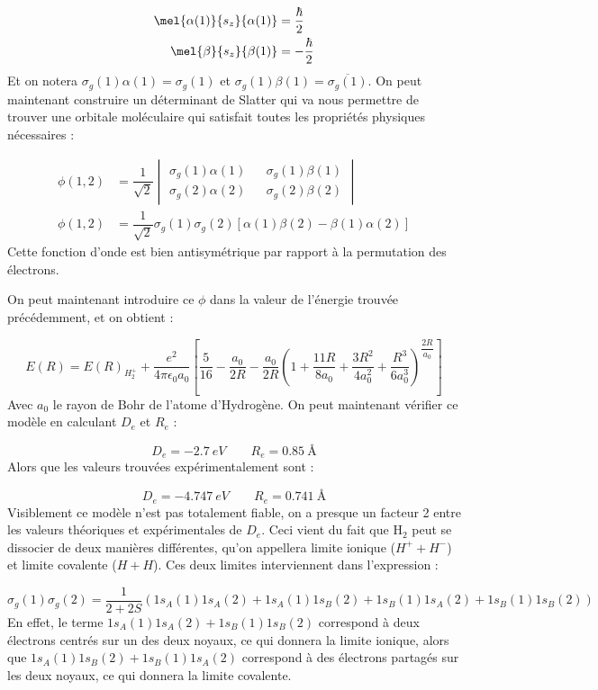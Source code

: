 \begin{align*}
    \mel{\alpha(1)}{s_z}{\alpha(1)} &= \dfrac{\hbar}{2}\\
    \mel{\beta}{s_z}{\beta(1)} &= -\dfrac{\hbar}{2}
\end{align*}
Et on notera $\sigma_g(1)\alpha(1) = \sigma_g(1)$ et $\sigma_g(1)\beta(1) = \overline{\sigma_g(1)}$. On peut maintenant construire un déterminant de Slatter qui va nous permettre de trouver une orbitale moléculaire qui satisfait toutes les propriétés physiques nécessaires :

\begin{align*}
    \phi(1,2) &= \dfrac{1}{\sqrt{2}}
    \begin{vmatrix}
        \sigma_g(1)\alpha(1) && \sigma_g(1)\beta(1)\\
        \sigma_g(2)\alpha(2) && \sigma_g(2)\beta(2)
    \end{vmatrix}\\
    \phi(1,2) &= \dfrac{1}{\sqrt{2}}\sigma_g(1)\sigma_g(2)[\alpha(1)\beta(2)-\beta(1)\alpha(2)]
\end{align*}
Cette fonction d'onde est bien antisymétrique par rapport à la permutation des électrons.

On peut maintenant introduire ce $\phi$ dans la valeur de l'énergie trouvée précédemment, et on obtient :

\[
    E(R) = E(R)_{H^+_2} + \dfrac{e^2}{4\pi\epsilon_0a_0}\left[\dfrac{5}{16}-\dfrac{a_0}{2R}-\dfrac{a_0}{2R}\left(1+\dfrac{11R}{8a_0}+\dfrac{3R^2}{4a_0^2}+\dfrac{R^3}{6a_0^3}\right)^{\dfrac{2R}{a_0}}\right]
\]
Avec $a_0$ le rayon de Bohr de l'atome d'Hydrogène. On peut maintenant vérifier ce modèle en calculant $D_e$ et $R_e$ :

\[ D_e = \SI{-2.7}{eV} \quad \quad R_e = \SI{0.85}{\angstrom} \]
Alors que les valeurs trouvées expérimentalement sont :

\[ D_e = \SI{-4.747}{eV} \quad \quad R_e = \SI{0.741}{\angstrom} \]
Visiblement ce modèle n'est pas totalement fiable, on a presque un facteur 2 entre les valeurs théoriques et expérimentales de $D_e$. Ceci vient du fait que H$_2$ peut se dissocier de deux manières différentes, qu'on appellera limite ionique ($H^+ + H^-$) et limite covalente ($H+H$). Ces deux limites interviennent dans l'expression :

\[
    \sigma_g(1)\sigma_g(2) = \dfrac{1}{2+2S}(1s_A(1)1s_A(2)+1s_A(1)1s_B(2)+1s_B(1)1s_A(2)+1s_B(1)1s_B(2))
\]
En effet, le terme $1s_A(1)1s_A(2)+1s_B(1)1s_B(2)$ correspond à deux électrons centrés sur un des deux noyaux, ce qui donnera la limite ionique, alors que $1s_A(1)1s_B(2)+1s_B(1)1s_A(2)$ correspond à des électrons partagés sur les deux noyaux, ce qui donnera la limite covalente.

